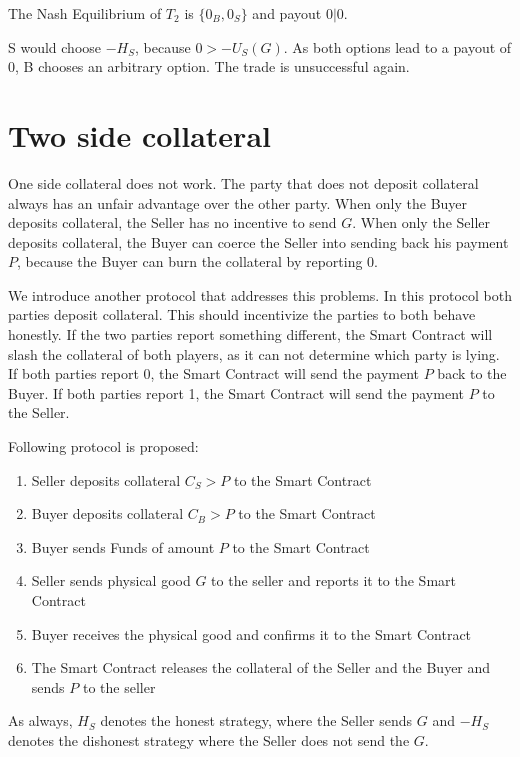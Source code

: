 \documentclass{cacthesis}
\begin{document}
The Nash Equilibrium of $T_2$ is $\{0_B, 0_S\}$ and payout $0 | 0$. \newline

S would choose $-H_S$, because $0>-U_S(G)$.\newline
As both options lead to a payout of 0, B chooses an arbitrary option. The trade is unsuccessful again.


\section{Two side collateral}
One side collateral does not work. The party that does not deposit collateral always has an unfair advantage over the other party. \newline
When only the Buyer deposits collateral, the Seller has no incentive to send $G$. \newline
When only the Seller deposits collateral, the Buyer can coerce the Seller into sending back his payment $P$, because the Buyer can burn the collateral by reporting 0.\newline 

We introduce another protocol that addresses this problems. In this protocol both parties deposit collateral. This should incentivize the parties to both behave honestly.\newline
If the two parties report something different, the Smart Contract will slash the collateral of both players, as it can not determine which party is lying. If both parties report 0, the Smart Contract will send the payment $P$ back to the Buyer. If both parties report 1, the Smart Contract will send the payment $P$ to the Seller.  \newline


Following protocol is proposed:
\begin{enumerate}
    \item Seller deposits collateral $C_S > P$ to the Smart Contract
    \item Buyer deposits collateral $C_B > P$ to the Smart Contract
    \item Buyer sends Funds of amount $P$ to the Smart Contract
    \item Seller sends physical good $G$ to the seller and reports it to the Smart Contract
    \item Buyer receives the physical good and confirms it to the Smart Contract
    \item The Smart Contract releases the collateral of the Seller and the Buyer and sends $P$ to the seller
\end{enumerate}
As always, $H_S$ denotes the honest strategy, where the Seller sends $G$ and $-H_S$ denotes the dishonest strategy where the Seller does not send the $G$.
\end{document}
